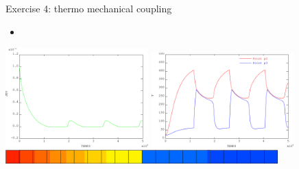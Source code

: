 \begin{frame}{
                 {Exercise 4: thermo mechanical coupling}}
             {}
  \begin{itemize}
    \item {}
  \end{itemize}
  \begin{center}
    \includegraphics[width=5.5cm]{images/exo/exo_4_solu_bis_evol_jeu}
    \includegraphics[width=5.5cm]{images/exo/exo_4_solu_bis_evol_t}\\
    \vspace{0.5cm}
    \if {}
    \else
      \includegraphics[width=10.5cm]{images/exo/exo_4_solu_bis_temperature.101}
    \fi
  \end{center}
\end{frame}
